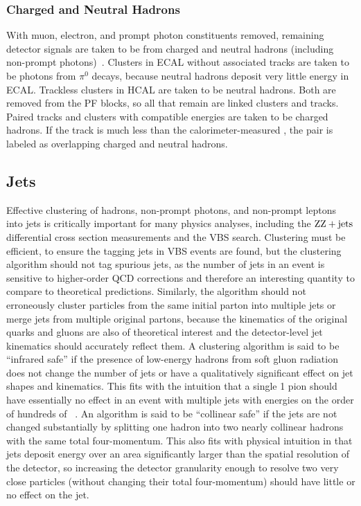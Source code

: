 \subsubsection{Charged and Neutral Hadrons}

With muon, electron, and prompt photon constituents removed, remaining detector signals are taken to be from charged and neutral hadrons (including non-prompt photons)~\cite{CMS:2009nxa,Sirunyan:2017ulk}.
Clusters in ECAL without associated tracks are taken to be photons from $\pi^0$ decays, because neutral hadrons deposit very little energy in ECAL\@.
Trackless clusters in HCAL are taken to be neutral hadrons.
Both are removed from the PF blocks, so all that remain are linked clusters and tracks.
Paired tracks and clusters with compatible energies are taken to be charged hadrons.
If the track {\pt} is much less than the calorimeter-measured {\pt}, the pair is labeled as overlapping charged and neutral hadrons.


\subsection{Jets}

Effective clustering of hadrons, non-prompt photons, and non-prompt leptons into jets is critically important for many physics analyses, including the $\mathrm{Z}\mathrm{Z} + \text{jets}$ differential cross section measurements and the {\ZZ} VBS search.
Clustering must be efficient, to ensure the tagging jets in VBS events are found, but the clustering algorithm should not tag spurious jets, as the number of jets in an event is sensitive to higher-order QCD corrections and therefore an interesting quantity to compare to theoretical predictions.
Similarly, the algorithm should not erroneously cluster particles from the same initial parton into multiple jets or merge jets from multiple original partons, because the kinematics of the original quarks and gluons are also of theoretical interest and the detector-level jet kinematics should accurately reflect them.
A clustering algorithm is said to be ``infrared safe'' if the presence of low-energy hadrons from soft gluon radiation does not change the number of jets or have a qualitatively significant effect on jet shapes and kinematics.
This fits with the intuition that a single {1\GeV} pion should have essentially no effect in an event with multiple jets with energies on the order of hundreds of {\GeVns}~\cite{Salam:2007xv}.
An algorithm is said to be ``collinear safe'' if the jets are not changed substantially by splitting one hadron into two nearly collinear hadrons with the same total four-momentum.
This also fits with physical intuition in that jets deposit energy over an area significantly larger than the spatial resolution of the detector, so increasing the detector granularity enough to resolve two very close particles (without changing their total four-momentum) should have little or no effect on the jet.

